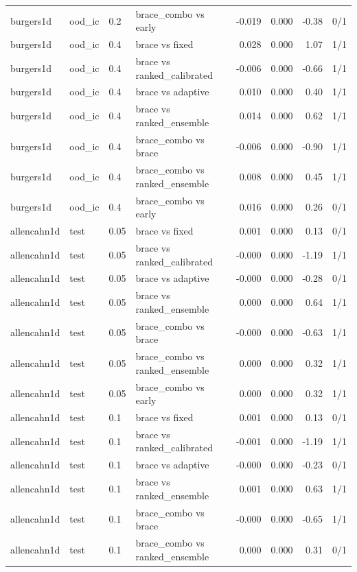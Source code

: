 \begin{tabular}{llllrrrr}
burgers1d & ood\_ic & 0.2 & brace\_combo vs early & -0.019 & 0.000 & -0.38 & 0/1 \\
burgers1d & ood\_ic & 0.4 & brace vs fixed & 0.028 & 0.000 & 1.07 & 1/1 \\
burgers1d & ood\_ic & 0.4 & brace vs ranked\_calibrated & -0.006 & 0.000 & -0.66 & 1/1 \\
burgers1d & ood\_ic & 0.4 & brace vs adaptive & 0.010 & 0.000 & 0.40 & 1/1 \\
burgers1d & ood\_ic & 0.4 & brace vs ranked\_ensemble & 0.014 & 0.000 & 0.62 & 1/1 \\
burgers1d & ood\_ic & 0.4 & brace\_combo vs brace & -0.006 & 0.000 & -0.90 & 1/1 \\
burgers1d & ood\_ic & 0.4 & brace\_combo vs ranked\_ensemble & 0.008 & 0.000 & 0.45 & 1/1 \\
burgers1d & ood\_ic & 0.4 & brace\_combo vs early & 0.016 & 0.000 & 0.26 & 0/1 \\
allencahn1d & test & 0.05 & brace vs fixed & 0.001 & 0.000 & 0.13 & 0/1 \\
allencahn1d & test & 0.05 & brace vs ranked\_calibrated & -0.000 & 0.000 & -1.19 & 1/1 \\
allencahn1d & test & 0.05 & brace vs adaptive & -0.000 & 0.000 & -0.28 & 0/1 \\
allencahn1d & test & 0.05 & brace vs ranked\_ensemble & 0.000 & 0.000 & 0.64 & 1/1 \\
allencahn1d & test & 0.05 & brace\_combo vs brace & -0.000 & 0.000 & -0.63 & 1/1 \\
allencahn1d & test & 0.05 & brace\_combo vs ranked\_ensemble & 0.000 & 0.000 & 0.32 & 1/1 \\
allencahn1d & test & 0.05 & brace\_combo vs early & 0.000 & 0.000 & 0.32 & 1/1 \\
allencahn1d & test & 0.1 & brace vs fixed & 0.001 & 0.000 & 0.13 & 0/1 \\
allencahn1d & test & 0.1 & brace vs ranked\_calibrated & -0.001 & 0.000 & -1.19 & 1/1 \\
allencahn1d & test & 0.1 & brace vs adaptive & -0.000 & 0.000 & -0.23 & 0/1 \\
allencahn1d & test & 0.1 & brace vs ranked\_ensemble & 0.001 & 0.000 & 0.63 & 1/1 \\
allencahn1d & test & 0.1 & brace\_combo vs brace & -0.000 & 0.000 & -0.65 & 1/1 \\
allencahn1d & test & 0.1 & brace\_combo vs ranked\_ensemble & 0.000 & 0.000 & 0.31 & 0/1 \\

\end{tabular}

